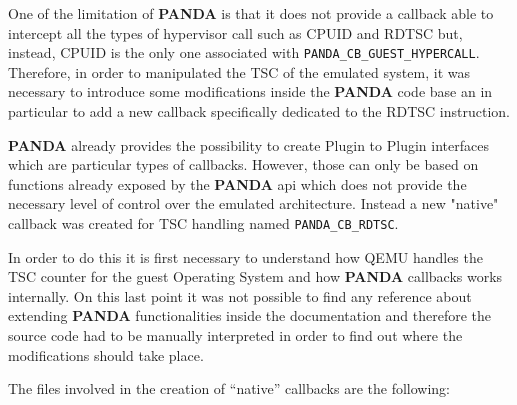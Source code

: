 One of the limitation of \textbf{PANDA} is that it does not provide a callback able to intercept all the types of hypervisor call such as CPUID and RDTSC but, instead, CPUID is the only one associated with \lstinline{PANDA_CB_GUEST_HYPERCALL}. Therefore, in order to manipulated the TSC of the emulated system, it was necessary to introduce some modifications inside the \textbf{PANDA} code base an in particular to add a new callback specifically dedicated to the RDTSC instruction. 

\textbf{PANDA} already provides the possibility to create Plugin to Plugin interfaces which are particular types of callbacks. However, those can only be based on functions already exposed by the \textbf{PANDA} api which does not provide the necessary level of control over the emulated architecture. Instead a new "native" callback was created for TSC handling named \lstinline{PANDA_CB_RDTSC}. 

In order to do this it is first necessary to understand how QEMU handles the TSC counter for the guest Operating System and how \textbf{PANDA} callbacks works internally. On this last point it was not possible to find any reference about extending \textbf{PANDA} functionalities inside the documentation and therefore the source code had to be manually interpreted in order to find out where the modifications should take place.

The files involved in the creation of ``native'' callbacks are the following: 

